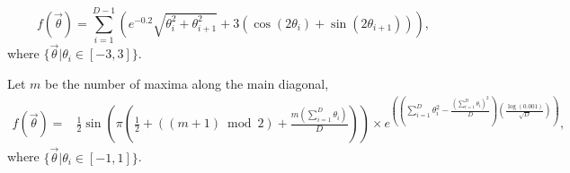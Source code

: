 
$$
f(\vec{\theta}) = \sum_{i=1}^{D-1}\left(e^{-0.2}\sqrt{\theta_i^2+\theta_{i+1}^2} + 3(\cos(2\theta_i) + \sin(2\theta_{i+1}))\right),
$$
where $\{\vec{\theta}|\theta_i\in [-3,3]\}$.

Let $m$ be the number of maxima along the main diagonal,
\begin{eqnarray*}
f(\vec{\theta}) = & \frac{1}{2}\sin\left(\pi\left(\frac{1}{2} + \left((m+1) \bmod{2}\right) + \frac{m\left(\sum_{i=1}^{D}\theta_i\right)}{D}\right)\right)
 \times e^{\left(\left(\sum_{i=1}^{D}\theta_i^2 -\frac{\left(\sum_{i=1}^{D}\theta_i\right)^2}{D}\right)\left(\frac{\log(0.001)}{\sqrt{D}}\right)\right)},
\end{eqnarray*}
where
$\{\vec{\theta}|\theta_i\in [-1,1]\}$.


